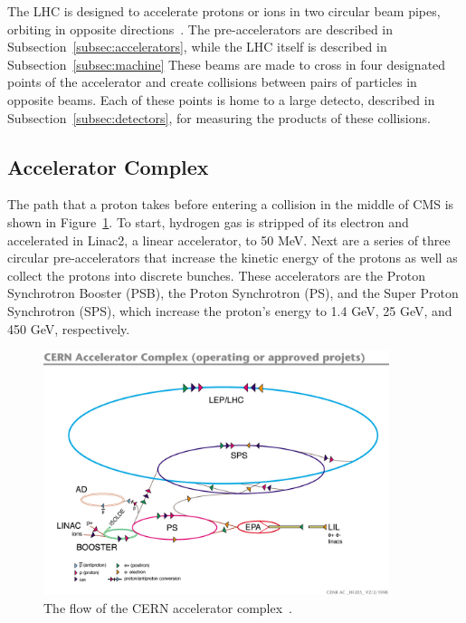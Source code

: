 The LHC is designed to accelerate protons or ions in two circular beam pipes, orbiting in opposite directions~\cite{cern-accelerators}. The pre-accelerators are described in Subsection~\ref{subsec:accelerators}, while the LHC
itself is described in Subsection~\ref{subsec:machine}
These beams are made to cross in four designated points of the accelerator and create collisions between
pairs of particles in opposite beams.
Each of these points is home to a large detecto, described in Subsection~\ref{subsec:detectors},
for measuring the products of these collisions.

\subsection{Accelerator Complex\label{subsec:accelerators}}

The path that a proton takes before entering a collision in the middle of CMS is shown in
Figure~\ref{fig:cern_accelerators}. To start, hydrogen gas is
stripped of its electron and accelerated in
Linac2, a linear accelerator, to 50 MeV. Next are a series of three circular pre-accelerators that
increase the kinetic energy of the protons as well as collect the protons into discrete bunches.
These accelerators are the Proton Synchrotron Booster (PSB), the Proton Synchrotron (PS), and the
Super Proton Synchrotron (SPS), which increase the proton's energy to 1.4 GeV, 25 GeV, and 450 GeV,
respectively. 

\begin{figure}[ht]
 \begin{center}
    \includegraphics[width=0.90\textwidth]{figures/experiment/lhc-pho-1991-001.jpg}
      \end{center}
\caption{The flow of the CERN accelerator complex~\cite{Jean-Luc:841493}.}
\label{fig:cern_accelerators}
\end{figure}

